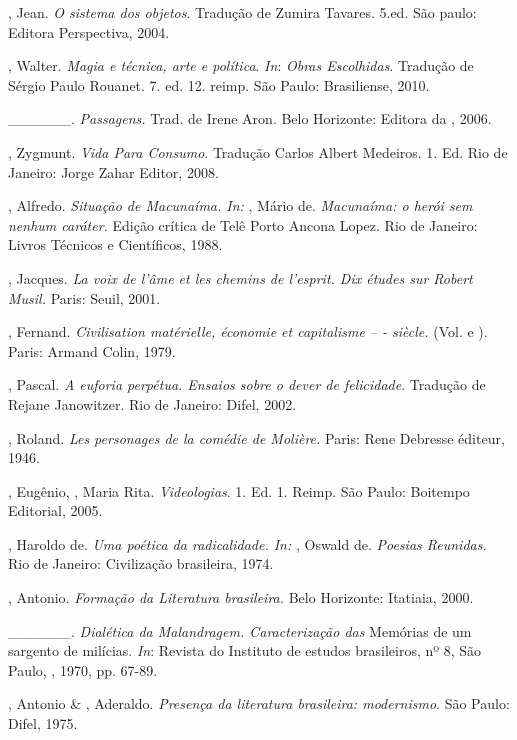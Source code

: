 \begin{Parskip}
, Jean. \emph{O sistema dos objetos}. Tradução de
Zumira Tavares. 5.ed. São paulo: Editora Perspectiva, 2004.

, Walter. \emph{Magia e técnica, arte e política}. \emph{In}: \emph{Obras
Escolhidas}. Tradução de Sérgio Paulo Rouanet. 7. ed. 12. reimp. São Paulo: Brasiliense, 2010.

\_\_\_\_\_\_. \emph{Passagens.} Trad. de Irene Aron. Belo Horizonte:
Editora da , 2006.

, Zygmunt. \emph{Vida Para Consumo}. Tradução Carlos Albert
Medeiros. 1. Ed. Rio de Janeiro: Jorge Zahar Editor, 2008.

, Alfredo. \emph{Situação de Macunaíma. In:} , Mário de.
\emph{Macunaíma: o herói sem nenhum caráter.} Edição crítica de Telê
Porto Ancona Lopez. Rio de Janeiro: Livros Técnicos e Científicos, 1988.

, Jacques. \emph{La voix de l'âme et les chemins de
l'esprit. Dix études sur Robert Musil.} Paris: Seuil, 2001.

, Fernand. \emph{Civilisation matérielle, économie et
capitalisme -- - siècle.} (Vol.  e ). Paris: Armand Colin, 1979.

, Pascal. \emph{A euforia perpétua. Ensaios sobre o dever de
felicidade}. Tradução de Rejane Janowitzer. Rio de Janeiro: Difel, 2002.

, Roland. \emph{Les personages de la comédie de Molière.}
Paris: Rene Debresse éditeur, 1946.

, Eugênio, , Maria Rita. \emph{Videologias}. 1. Ed. 1.
Reimp. São Paulo: Boitempo Editorial, 2005.

, Haroldo de. \emph{Uma poética da radicalidade. In:} ,
Oswald de. \emph{Poesias Reunidas.} Rio de Janeiro: Civilização brasileira, 1974.

, Antonio. \emph{Formação da Literatura brasileira.} Belo
Horizonte: Itatiaia, 2000.

\_\_\_\_\_\_. \emph{Dialética da Malandragem. Caracterização das}
Memórias de um sargento de milícias. \emph{In}: Revista do Instituto de
estudos brasileiros, nº 8, São Paulo, , 1970, pp. 67-89.

, Antonio \& , Aderaldo. \emph{Presença da literatura
brasileira: modernismo}. São Paulo: Difel, 1975.


\end{Parskip}
